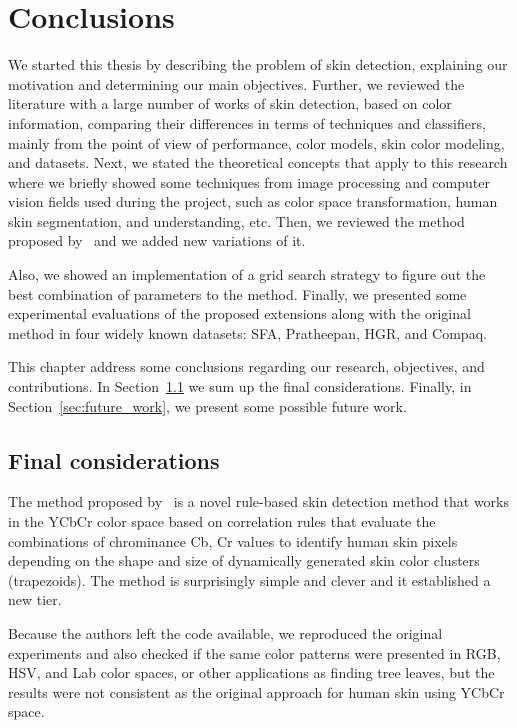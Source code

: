 \chapter{Conclusions}
\label{cap:conclusoes}

We started this thesis by describing the problem of skin detection, explaining our motivation and determining our main objectives. Further, we reviewed the literature with a large number of works of skin detection, based on color information, comparing their differences in terms of techniques and classifiers, mainly from the point of view of performance, color models, skin color modeling, and datasets. Next, we stated the theoretical concepts that apply to this research where we briefly showed some techniques from image processing and computer vision fields used during the project, such as color space transformation, human skin segmentation, and understanding, etc. Then, we reviewed the method proposed by~\citet{brancati:17} and we added new variations of it.

Also, we showed an implementation of a grid search strategy to figure out the best combination of parameters to the method. Finally, we presented some experimental evaluations of the proposed extensions along with the original method in four widely known datasets: SFA, Pratheepan, HGR, and Compaq.

This chapter address some conclusions regarding our research, objectives, and contributions. In Section~\ref{sec:final_considerations} we sum up the final considerations. Finally, in Section~\ref{sec:future_work}, we present some possible future work.


\section{Final considerations}
\label{sec:final_considerations}
The method proposed by~\citet{brancati:17} is a novel rule-based skin detection method that works in the YCbCr color space based on correlation rules that evaluate the combinations of chrominance Cb, Cr values to identify human skin pixels depending on the shape and size of dynamically generated skin color clusters (trapezoids). The method is surprisingly simple and clever and it established a new tier.

Because the authors left the code available, we reproduced the original experiments and also checked if the same color patterns were presented in RGB, HSV, and Lab color spaces, or other applications as finding tree leaves, but the results were not consistent as the original approach for human skin using YCbCr space.

